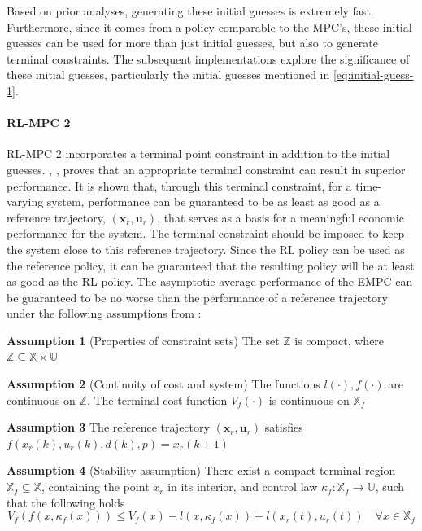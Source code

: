 Based on prior analyses, generating these initial guesses is extremely fast. Furthermore, since it comes from a policy comparable to the MPC’s, these initial guesses can be used for more than just initial guesses, but also to generate terminal constraints. The subsequent implementations explore the significance of these initial guesses, particularly the initial guesses mentioned in \autoref{eq:initial-guess-1}.

\paragraph{RL-MPC 2}
RL-MPC 2 incorporates a terminal point constraint in addition to the initial guesses. \citet{risbeckEconomicModelPredictive2020}, \citet{amritEconomicOptimizationUsing2011}, proves that an appropriate terminal constraint can result in superior performance. It is shown that, through this terminal constraint, for a time-varying system, performance can be guaranteed to be as least as good as a reference trajectory, $(\mathbf{x}_r, \mathbf{u}_r)$, that serves as a basis for a meaningful economic performance for the system. The terminal constraint should be imposed to keep the system close to this reference trajectory. Since the RL policy can be used as the reference policy, it can be guaranteed that the resulting policy will be at least as good as the RL policy. The asymptotic average performance of the EMPC can be guaranteed to be no worse than the performance of a reference trajectory under the following assumptions from \citet{amritEconomicOptimizationUsing2011,risbeckEconomicModelPredictive2020}:

\hspace{1cm} \textbf{Assumption 1} (Properties of constraint sets) The set $\mathbb{Z}$ is compact, where $\mathbb{Z} \subseteq \mathbb{X} \times \mathbb{U}$

\hspace{1cm} \textbf{Assumption 2}  (Continuity of cost and system) The functions $l(\cdot), f(\cdot)$ are continuous on $\mathbb{Z}$. The terminal cost function $V_f(\cdot)$ is continuous on $\mathbb{X}_f$ 

\hspace{1cm} \textbf{Assumption 3}  The reference trajectory $(\mathbf{x}_r, \mathbf{u}_r)$ satisfies $f(x_r(k),u_r(k),d(k),p)=x_r(k+1)$

\hspace{1cm} \textbf{Assumption 4} (Stability assumption) There exist a compact terminal region $\mathbb{X}_f \subseteq \mathbb{X}$, containing the point $x_r$ in its interior, and control law $\kappa_f : \mathbb{X}_f \rightarrow \mathbb{U}$, such that the following holds 
\begin{equation}\label{eq:assumption_3}
	V_f(f(x,\kappa_f(x))) \leq V_f(x) - l(x,\kappa_f(x)) + l(x_r(t),u_r(t)) \quad \forall x \in \mathbb{X}_f
\end{equation}

